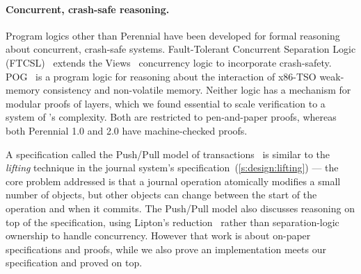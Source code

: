 

\paragraph{Concurrent, crash-safe reasoning.}

Program logics other than Perennial
have been developed for formal reasoning about concurrent, crash-safe systems.
Fault-Tolerant Concurrent Separation Logic (FTCSL)~\cite{ntzik:faults} extends
the Views~\cite{dinsdale:views} concurrency logic to incorporate crash-safety.
POG~\cite{raad:pog} is a program logic for reasoning about the interaction of
x86-TSO weak-memory consistency and non-volatile memory.
Neither logic has a mechanism for modular proofs of layers,
which we found essential to scale verification to a system of \txn's
complexity. Both are restricted to pen-and-paper proofs, whereas both Perennial
1.0 and 2.0 have machine-checked proofs.

A specification called the Push/Pull model of
transactions~\cite{koskinen:pushpull} is similar to the \emph{lifting} technique
in the journal system's specification~(\autoref{s:design:lifting}) --- the core
problem addressed is that a journal operation atomically modifies a small number
of objects, but other objects can change between the start of the operation and when
it commits. The Push/Pull model also discusses reasoning on top of the
specification, using Lipton's reduction~\cite{lipton:movers} rather than
separation-logic ownership to handle concurrency. However that work is about
on-paper specifications and proofs, while we also prove an implementation meets
our specification and proved \simplenfs on top.
